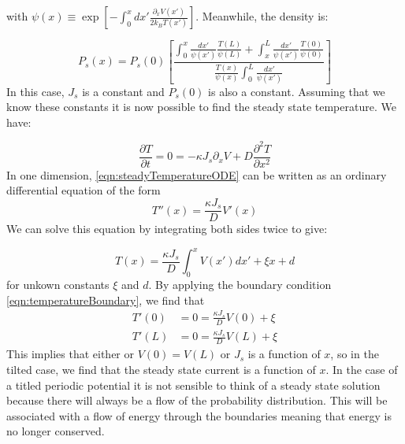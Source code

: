 with $\psi(x) \equiv \exp[-\int_0^x dx' \frac{\partial_x V(x')}{2 k_B T(x')}]$. Meanwhile, the density is:

\begin{equation}
P_s(x) = P_s(0) \left [\frac{\int_0^x \frac{dx'}{\psi(x')} \frac{T(L)}{\psi(L)} + \int_x^L \frac{dx'}{\psi(x')} \frac{T(0)}{\psi(0)} }{\frac{T(x)}{\psi(x)} \int_0^L \frac{dx'}{\psi(x')} } \right]
\label{eqn:SteadyDensity}
\end{equation}
In this case, $J_s$ is a constant and $P_s(0)$ is also a constant. Assuming that we know these constants it is now possible to find the steady state temperature. We have:

\begin{equation}
\frac{\partial T}{\partial t} = 0 = -\kappa J_s \partial_x V + D \frac{\partial^2 T}{\partial x^2} \label{eqn:steadyTemperatureODE}
\end{equation}
In one dimension, \ref{eqn:steadyTemperatureODE} can be written as an ordinary differential equation of the form
\begin{equation}
T''(x) = \frac{\kappa J_s}{D} V'(x)
\end{equation}
We can solve this equation by integrating both sides twice to give:

\begin{equation}
T(x) = \frac{\kappa J_s}{D} \int_0^x V(x') dx' + \xi x + d \label{eqn:steadyTemperature}
\end{equation}
for unkown constants $\xi$ and $d$. By applying the boundary condition \ref{eqn:temperatureBoundary}, we find that
\begin{align}
T'(0) & = 0 = \frac{\kappa J_s}{D} V(0) + \xi \\
T'(L) & = 0 = \frac{\kappa J_s}{D} V(L) + \xi
\end{align}
This implies that either or $V(0) = V(L)$ or $J_s$ is a function of $x$, so in the tilted case, we find that the steady state current is a function of $x$. In the case of a titled periodic potential it is not sensible to think of a steady state solution because there will always be a flow of the probability distribution. This will be associated with  a flow of energy through the boundaries meaning that energy is no longer conserved.

